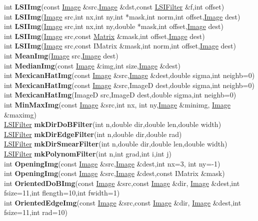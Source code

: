 \documentclass[10pt,titlepage]{article}
\def\functionlistentry#1#2#3#4#5#6{\noindent #1 {\bf #2}(#3) \dotfill #6\\}
\begin{document}
{{\functionlistentry{int}{LSIImg}{const \hyperlink{Image}{Image} \&src,\hyperlink{Image}{Image} \&dst,const \hyperlink{LSIFilter}{LSIFilter} \&f,int offset}{333}{filter}{}
\functionlistentry{int}{LSIImg}{\hyperlink{Image}{Image} src,int nx,int ny,int *mask,int norm,int offset,\hyperlink{Image}{Image} dest}{334}{filter}{}
\functionlistentry{int}{LSIImg}{\hyperlink{Image}{Image} src,int nx,int ny,double *mask,int offset,\hyperlink{Image}{Image} dest}{335}{filter}{}
\functionlistentry{int}{LSIImg}{\hyperlink{Image}{Image} src,const \hyperlink{Matrix}{Matrix} \&mask,int offset,\hyperlink{Image}{Image} dest}{336}{filter}{}
\functionlistentry{int}{LSIImg}{\hyperlink{Image}{Image} src,const IMatrix \&mask,int norm,int offset,\hyperlink{Image}{Image} dest}{337}{filter}{}
\functionlistentry{int}{MeanImg}{\hyperlink{Image}{Image} src,\hyperlink{Image}{Image} dest}{348}{filter}{}
\functionlistentry{int}{MedianImg}{const \hyperlink{Image}{Image} \&img,int size,\hyperlink{Image}{Image} \&dest}{386}{filter}{}
\functionlistentry{int}{MexicanHatImg}{const \hyperlink{Image}{Image} \&src,\hyperlink{Image}{Image} \&dest,double sigma,int neighb=0}{355}{filter}{}
\functionlistentry{int}{MexicanHatImg}{const \hyperlink{Image}{Image} \&src,ImageD dest,double sigma,int neighb=0}{356}{filter}{}
\functionlistentry{int}{MexicanHatImg}{ImageD src,ImageD dest,double sigma,int neighb=0}{357}{filter}{}
\functionlistentry{int}{MinMaxImg}{const \hyperlink{Image}{Image} \&src,int nx, int ny,\hyperlink{Image}{Image} \&minimg, \hyperlink{Image}{Image} \&maximg}{383}{filter}{}
\functionlistentry{\hyperlink{LSIFilter}{LSIFilter}}{mkDirDoBFilter}{int n,double dir,double len,double width}{328}{filter}{}
\functionlistentry{\hyperlink{LSIFilter}{LSIFilter}}{mkDirEdgeFilter}{int n,double dir,double rad}{329}{filter}{}
\functionlistentry{\hyperlink{LSIFilter}{LSIFilter}}{mkDirSmearFilter}{int n,double dir,double len,double width}{327}{filter}{}
\functionlistentry{\hyperlink{LSIFilter}{LSIFilter}}{mkPolynomFilter}{int n,int grad,int i,int j}{326}{filter}{}
\functionlistentry{int}{OpeningImg}{const \hyperlink{Image}{Image} \&src,\hyperlink{Image}{Image} \&dest,int nx=3, int ny=-1}{379}{filter}{}
\functionlistentry{int}{OpeningImg}{const \hyperlink{Image}{Image} \&src,\hyperlink{Image}{Image} \&dest,const IMatrix \&mask}{380}{filter}{}
\functionlistentry{int}{OrientedDoBImg}{const \hyperlink{Image}{Image} \&src,const \hyperlink{Image}{Image} \&dir, \hyperlink{Image}{Image} \&dest,int fsize=11,int flength=10,int fwidth=1}{365}{filter}{}
\functionlistentry{int}{OrientedEdgeImg}{const \hyperlink{Image}{Image} \&src,const \hyperlink{Image}{Image} \&dir, \hyperlink{Image}{Image} \&dest,int fsize=11,int rad=10}{366}{filter}{}
}}
\end{document}
